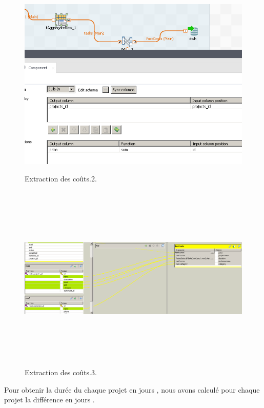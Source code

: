 \begin{figure}[H]
\center
\includegraphics[width=14cm,height=9cm]{./figures/integ1.png}
\caption{Extraction des co\^{u}ts.2.}
\end{figure}


\begin{figure}[H]
\center
\includegraphics[width=14cm,height=9cm]{./figures/integ3.png}
\caption{Extraction des co\^{u}ts.3.}
\end{figure}



Pour obtenir la dur\'{e}e du chaque projet en jours ,
nous avons calcul\'{e} pour chaque projet la diff\'{e}rence en jours .

